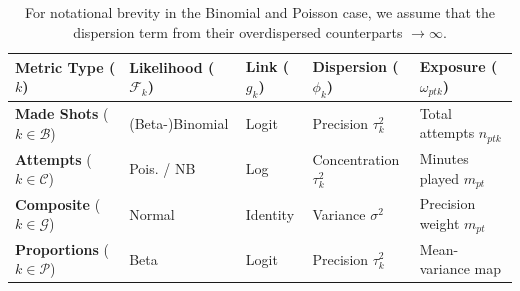 \documentclass[aoas]{imsart}
\begin{document}
\begin{table}[htbp]
\centering
\small
\caption{}
\label{tab:glm_framework}
\vspace{2mm}
\begin{tabular}{lllll}
\toprule
\textbf{Metric Type} ($k$) & \textbf{Likelihood} ($\mathcal{F}_k$) & \textbf{Link} ($g_k$) & \textbf{Dispersion} ($\phi_k$) & \textbf{Exposure} ($\omega_{ptk}$) \\
\midrule
\textbf{Made Shots} ($k \in \mathcal{B}$) & (Beta-)Binomial & Logit & Precision $\tau_k^2$  & Total attempts $n_{ptk}$ \\
\addlinespace
\textbf{Attempts} ($k \in \mathcal{C}$) & Pois. / NB & Log & Concentration $\tau_k^2$ & Minutes played $m_{pt}$ \\
\addlinespace
\addlinespace
\textbf{Composite} ($k \in \mathcal{G}$) & Normal & Identity & Variance $\sigma^2$ & Precision weight $m_{pt}$ \\
\addlinespace
\textbf{Proportions} ($k \in \mathcal{P}$) & Beta & Logit & Precision $\tau_k^2$ & Mean-variance map \\
\bottomrule
\end{tabular}
\caption{For notational brevity in the Binomial and Poisson case, we assume that the dispersion term from their overdispersed counterparts $\rightarrow \infty$.}
\end{table}


%
\end{document}
